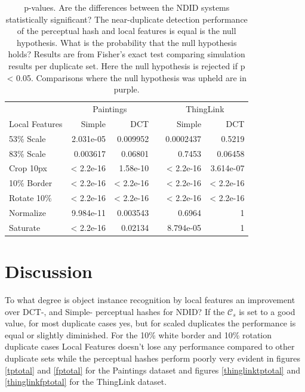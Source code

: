 \documentclass[english,12pt,a4paper,pdftex,elec,utf8, table]{aaltothesis}
\begin{document}
\begin{table} \footnotesize
\caption{p-values. Are the differences between the NDID systems statistically significant? The near-duplicate detection performance of the perceptual hash and local features is equal is the null hypothesis. What is the probability that the null hypothesis holds? Results are from Fisher's exact test \cite{fisher1922interpretation} comparing simulation results per duplicate set. Here the null hypothesis is rejected if p < 0.05. Comparisons where the null hypothesis was upheld are in purple.}
\label{pvalues}
\begin{center}
  \setlength\tabcolsep{3pt} %
  \begin{tabular}{@{}lrrrrr@{}}
    \toprule
    & \multicolumn{2}{c}{Paintings} &\phantom{abc} &\multicolumn{2}{c}{ThingLink}\\
\cmidrule{2-3} \cmidrule{5-6}
 Local Features & Simple & DCT &\phantom{abc} & Simple & DCT\\ \midrule
  53\% Scale   & 2.031e-05 & 0.009952 &\phantom{abc} & 0.0002437 & \cellcolor{blue!25}0.5219\\
  83\% Scale   & 0.003617 & \cellcolor{blue!25} 0.06801 &\phantom{abc} & \cellcolor{blue!25} 0.7453 & \cellcolor{blue!25} 0.06458\\
  Crop 10px    & < 2.2e-16 & 1.58e-10 &\phantom{abc} & < 2.2e-16 & 3.614e-07\\
  10\% Border  & < 2.2e-16 & < 2.2e-16 & \phantom{abc} & < 2.2e-16 & < 2.2e-16\\
  Rotate 10\%  & < 2.2e-16 & < 2.2e-16 &\phantom{abc} & < 2.2e-16 & < 2.2e-16\\
  Normalize    & 9.984e-11 & 0.003543 &\phantom{abc} & \cellcolor{blue!25} 0.6964 & \cellcolor{blue!25} 1\\
  Saturate     & < 2.2e-16 & 0.02134 &\phantom{abc} & 8.794e-05 & \cellcolor{blue!25}1 \\
    \bottomrule
\end{tabular}
\end{center}\end{table}

\clearpage

\section{Discussion}
To what degree is object instance recognition by local features an improvement over DCT-, and Simple- perceptual hashes for NDID? If the $\mathcal{C}_s$ is set to a good value, for most duplicate cases yes, but for scaled duplicates the performance is equal or slightly diminished. For the 10\% white border and 10\% rotation duplicate cases Local Features doesn't lose any performance compared to other duplicate sets while the perceptual hashes perform poorly very evident in figures \ref{tptotal} and \ref{fptotal} for the Paintings dataset and figures \ref{thinglinktptotal} and \ref{thinglinkfptotal} for the ThingLink dataset.
\end{document}
